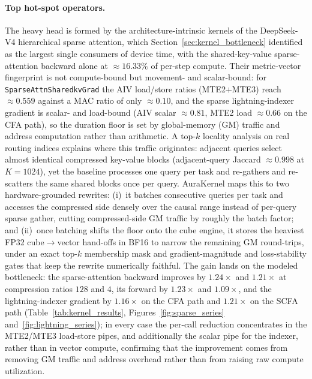\paragraph{Top hot-spot operators.}
The heavy head is formed by the architecture-intrinsic kernels of the DeepSeek-V4 hierarchical sparse attention, which Section~\ref{sec:kernel_bottleneck} identified as the largest single consumers of device time, with the shared-key-value sparse-attention backward alone at $\approx 16.33\%$ of per-step compute. Their metric-vector fingerprint is not compute-bound but movement- and scalar-bound: for \texttt{SparseAttnSharedkvGrad} the AIV load/store ratios (MTE2$+$MTE3) reach $\approx 0.559$ against a MAC ratio of only $\approx 0.10$, and the sparse lightning-indexer gradient is scalar- and load-bound (AIV scalar $\approx 0.81$, MTE2 load $\approx 0.66$ on the CFA path), so the duration floor is set by global-memory (GM) traffic and address computation rather than arithmetic. A top-$k$ locality analysis on real routing indices explains where this traffic originates: adjacent queries select almost identical compressed key-value blocks (adjacent-query Jaccard $\approx 0.998$ at $K{=}1024$), yet the baseline processes one query per task and re-gathers and re-scatters the same shared blocks once per query. AuraKernel maps this to two hardware-grounded rewrites: (i)~it batches consecutive queries per task and accesses the compressed side densely over the causal range instead of per-query sparse gather, cutting compressed-side GM traffic by roughly the batch factor; and (ii)~once batching shifts the floor onto the cube engine, it stores the heaviest FP32 cube$\rightarrow$vector hand-offs in BF16 to narrow the remaining GM round-trips, under an exact top-$k$ membership mask and gradient-magnitude and loss-stability gates that keep the rewrite numerically faithful. The gain lands on the modeled bottleneck: the sparse-attention backward improves by $1.24\times$ and $1.21\times$ at compression ratios $128$ and $4$, its forward by $1.23\times$ and $1.09\times$, and the lightning-indexer gradient by $1.16\times$ on the CFA path and $1.21\times$ on the SCFA path (Table~\ref{tab:kernel_results}, Figures~\ref{fig:sparse_series} and~\ref{fig:lightning_series}); in every case the per-call reduction concentrates in the MTE2/MTE3 load-store pipes, and additionally the scalar pipe for the indexer, rather than in vector compute, confirming that the improvement comes from removing GM traffic and address overhead rather than from raising raw compute utilization.

